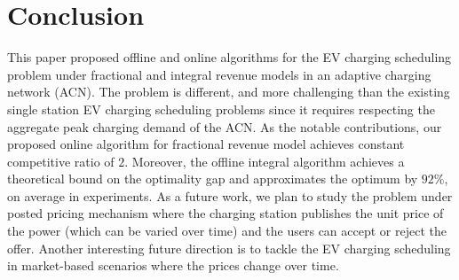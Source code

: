 \documentclass[journal]{IEEEtran}
\newcommand{\revv}[1]{{\color{black}#1}}%
\newcommand{\focs}{\textsc{foCS}\xspace}
\newcommand{\iocs}{\textsc{ioCS}\xspace}
\begin{document}
%					

			\section{Conclusion}
			\label{sec:conclusion}
This paper proposed offline and online algorithms for the EV charging scheduling problem under fractional and integral revenue models in an adaptive charging network (ACN). The problem is different, and more challenging than the existing single station EV charging scheduling problems since it requires respecting the aggregate peak charging demand of the ACN. 
As the notable contributions, our proposed online algorithm for fractional revenue model achieves constant competitive ratio of $2$. Moreover, the offline integral algorithm achieves a theoretical bound on the optimality gap and approximates the optimum by $92\%$, on average in experiments. As a future work, we plan to study the problem under posted pricing mechanism where the charging station publishes the unit price of the power (which can be varied over time) and the users can accept or reject the offer.
\revv{Another interesting future direction is to tackle the EV charging scheduling in market-based scenarios where the prices change over time.}
\end{document}
